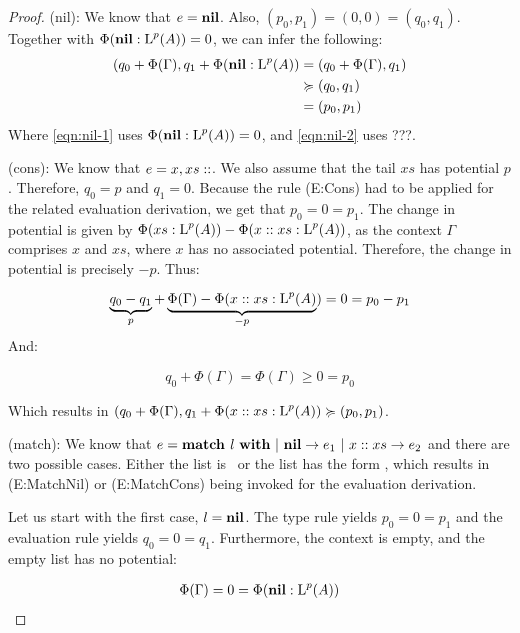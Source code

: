 \begin{proof}
   (nil): We know that \(e = \textbf{nil}\). Also, \((p_0, p_1) = (0, 0) = (q_0, q_1)\). Together with \(\Phi(\textbf{nil} : \text{L}^{p}(A)) = 0\), we can infer the following:
   \begin{align}
      (q_0 + \Phi(\Gamma), q_1 + \Phi(\listnil : \ralist{p}{A})   &= (q_0 + \Phi(\Gamma), q_1)\label{eqn:nil-1} \\
                                                                  &\relaxation (q_0, q_1) \label{eqn:nil-2}\\
                                                                  &= (p_0, p_1)
   \end{align}
   Where \cref{eqn:nil-1} uses \(\Phi(\textbf{nil}: \text{L}^{p}(A)) = 0\), and \cref{eqn:nil-2} uses ???. 

   (cons): We know that \(e = x, xs :: \). We also assume that the tail \(xs\) has potential \(p\). Therefore, \(q_0 = p\) and \(q_1 = 0\). Because the rule (E:Cons) had to be applied for the related evaluation derivation, we get that \(p_0 = 0 = p_1\).   
   The change in potential is given by \(\Phi(xs : \text{L}^{p}(A)) - \Phi(x :: xs : \text{L}^{p}(A))\), as the context \(\Gamma\) comprises \(x\) and \(xs\), where \(x\) has no associated potential. Therefore, the change in potential is precisely \(-p\). Thus:

   \[
      \underbrace{q_0 - q_1}_{p} + \underbrace{\Phi(\Gamma) - \Phi(x :: xs : \text{L}^{p}(A)}_{-p}) = 0 = p_0 - p_1
   \] 
   And:

   \[
      q_0 + \Phi(\Gamma) = \Phi(\Gamma) \geq 0 = p_0
   \]

   Which results in \((q_0 + \Phi(\Gamma), q_1 + \Phi(x :: xs : \text{L}^{p}(A)) \succcurlyeq (p_0, p_1)\). 

   (match): We know that \(e = \textbf{match } l~\textbf{with}~|~\textbf{nil} \to e_1~|~x :: xs \to e_2\) and there are two possible cases. Either the list is \listnil ~or the list has the form , which results in (E:MatchNil) or (E:MatchCons) being invoked for the evaluation derivation. 

   Let us start with the first case, \(l = \textbf{nil}\). The type rule yields \(p_0 = 0 = p_1\) and the evaluation rule yields \(q_0 = 0 = q_1\). Furthermore, the context is empty, and the empty list has no potential:

   \begin{align*}
      \Phi(\Gamma) = 0 = \Phi(\textbf{nil} : \text{L}^{p}(A))\\
   \end{align*}


\end{proof}
